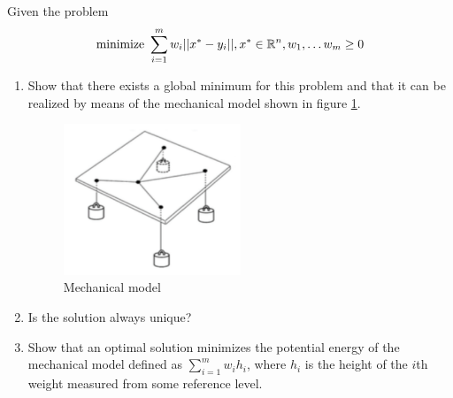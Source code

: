 \begin{proposition}
    Given the problem
    \[\text{minimize }\sum_{i=1}^{m}w_i||x^*-y_i||, x^*\in\mathbb{R}^n, w_1, \dots w_m \geq 0\]
    \begin{enumerate}
        \item Show that there exists a global minimum for this problem and that it can be realized by means of the mechanical model shown in figure \ref{mechanical-model}.
        \begin{figure}[h]
            \centering
            \includegraphics[width=0.5\textwidth]{../Images/mechanical_model.png}
            \caption{Mechanical model}
            \label{mechanical-model}
        \end{figure}
        \item Is the solution always unique?
        \item Show that an optimal solution minimizes the potential energy of the mechanical model defined as \(\sum_{i=1}^{m}w_ih_i\), where \(h_i\) is the height of the \(i\)th weight measured from some reference level.
    \end{enumerate}
\end{proposition}